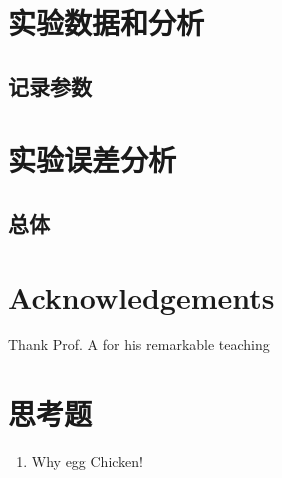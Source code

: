 \documentclass[aps, twocolumn, pra, superscriptaddress, amsmath, showpacs, tightenlines, letterpaper,showkeys] {revtex4-1}
\begin{document}
\section{实验数据和分析}
\subsection{记录参数}

\section{实验误差分析}

\subsection{总体}





\section{Acknowledgements}

Thank Prof. A for his remarkable teaching



\nocite{scully1999quantum}


\appendix

\section{思考题}
\begin{enumerate}
\item Why egg
Chicken!

\end{enumerate}
\end{document}

